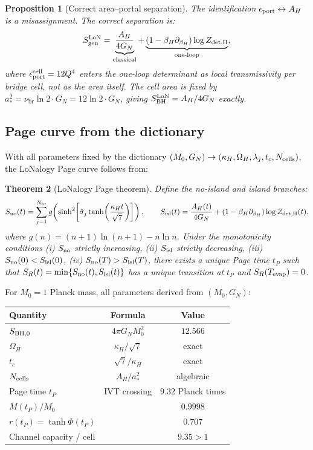 \documentclass[12pt]{article}
\theoremstyle{plain}
\newtheorem{theorem}{Theorem}[section]
\newtheorem{proposition}[theorem]{Proposition}
\theoremstyle{definition}
\numberwithin{equation}{section}
\newcommand{\br}{\mathrm{br}}
\begin{document}
\begin{proposition}[Correct area--portal separation]\label{prop:BHsep}
The identification $\epsilon_{\rm port} \leftrightarrow A_H$ is a misassignment.  The correct separation is:
\[
S_{\rm gen}^{\rm LoN} = \underbrace{\frac{A_H}{4G_N}}_{\rm classical} + \underbrace{\left(1-\beta_H\partial_{\beta_H}\right)\log Z_{\rm det,H}}_{\rm one\text{-}loop},
\]
where $\epsilon_{\rm port}^{\rm cell} = 12Q^4$ enters the one-loop determinant as local transmissivity per bridge cell, not as the area itself.  The cell area is fixed by $a_*^2 = \nu_\br\ln 2\cdot G_N = 12\ln 2\cdot G_N$, giving $S_{\rm BH}^{\rm LoN} = A_H/4G_N$ exactly.
\end{proposition}

\subsection{Page curve from the dictionary}

With all parameters fixed by the dictionary $(M_0, G_N) \to (\kappa_H, \Omega_H, \lambda_j, t_c, N_{\rm cells})$, the LoNalogy Page curve follows from:

\begin{theorem}[LoNalogy Page theorem]\label{thm:BHpage}
Define the no-island and island branches:
\[
S_{\rm no}(t) = \sum_{j=1}^{N_\br} g\!\left(\sinh^2\!\left[\hat{\sigma}_j\tanh\!\left(\frac{\kappa_H t}{\sqrt{7}}\right)\right]\right),
\qquad
S_{\rm isl}(t) = \frac{A_H(t)}{4G_N} + \left(1-\beta_H\partial_{\beta_H}\right)\log Z_{\rm det,H}(t),
\]
where $g(n) = (n+1)\ln(n+1) - n\ln n$.  Under the monotonicity conditions (i) $S_{\rm no}$ strictly increasing, (ii) $S_{\rm isl}$ strictly decreasing, (iii) $S_{\rm no}(0) < S_{\rm isl}(0)$, (iv) $S_{\rm no}(T) > S_{\rm isl}(T)$, there exists a unique Page time $t_P$ such that $S_R(t) = \min\{S_{\rm no}(t), S_{\rm isl}(t)\}$ has a unique transition at $t_P$ and $S_R(T_{\rm evap}) = 0$.
\end{theorem}

For $M_0 = 1$ Planck mass, all parameters derived from $(M_0, G_N)$:

\begin{center}
\begin{tabular}{lcc}
\toprule
Quantity & Formula & Value\\
\midrule
$S_{\rm BH,0}$ & $4\pi G_N M_0^2$ & $12.566$\\
$\Omega_H$ & $\kappa_H/\sqrt{7}$ & exact\\
$t_c$ & $\sqrt{7}/\kappa_H$ & exact\\
$N_{\rm cells}$ & $A_H/a_*^2$ & algebraic\\
Page time $t_P$ & IVT crossing & $9.32$ Planck times\\
$M(t_P)/M_0$ & & $0.9998$\\
$r(t_P) = \tanh\Phi(t_P)$ & & $0.707$\\
Channel capacity / cell & & $9.35 > 1$\\
\bottomrule
\end{tabular}
\end{center}
\end{document}
